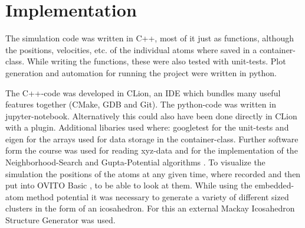 \chapter{Implementation}
\begin{comment}	
	go about structure of the code 
	-> describe Code structure
		
	-> c++ was used to implement the code (mostly functional)
	-> key atoms container Class which holdes all the Values
	-> most functions were tested with googleTest
\end{comment}

\begin{comment}
code written in c++ most of it pretty functional, classes just used 
for the atoms container which holds the arrays 
while writing it also wrote the unittests with googletest
data aquiered form the code plotted with python
also where large simulations had to be run, called the program from the python code

\end{comment}
The simulation code was written in C++, most of it just as functions, although the positions, velocities, etc. of the individual atoms where saved in a container-class.
While writing the functions, these were also tested with unit-tests.
Plot generation and automation for running the project were written in python.

\begin{comment}
developed in CLion which as an integrated git inviroment
Clion builds with Cmake then clang as a compiler
debugger is gdb(nicely hidden)
- additianal bibs where :
	googletest	for unittests
	eigen		for arrays 
- software used form the class itself 
- ovito for visualization
\end{comment}
The C++-code was developed in CLion, an IDE which bundles many useful features together (CMake, GDB and Git).
The python-code was written in jupyter-notebook. Alternatively this could also have been done directly in CLion with a plugin. 
Additional libaries used where: googletest \cite{googletest} for the unit-tests and eigen \cite{eigen} for the arrays used for data storage in the container-class. 
Further software form the course was used for reading xyz-data and for the implementation of the Neighborhood-Search and Gupta-Potential algorithms \cite{molDymCourse}. 
To visualize the simulation the positions of the atoms at any given time, where recorded and then put into OVITO Basic \cite{ovito}, to be able to look at them.
While using the embedded-atom method potential it was necessary to generate a variety of different sized clusters in the form of an icosahedron. For this an external Mackay Icosahedron Structure Generator \cite{icosader} was used.
\begin{comment}
--
code is structured into the milestones, so an individual milestone can be rerun in case of fuckup
parted into h and cpp files as usual
followed the structure of the milestone
\end{comment}

